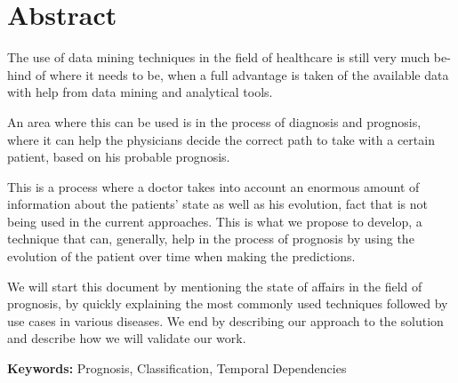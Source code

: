 
\section*{Abstract}


The use of data mining techniques in the field of healthcare is still very much be-hind of where it needs to be, when a full
advantage is taken of the available data with help from data mining and analytical tools.

An area where this can be used is in the process of diagnosis and prognosis, where it can help the physicians decide the
 correct path to take with a certain patient, based on his probable prognosis. 

This is a process where a doctor takes into account an enormous amount of information about the patients’ state as well
 as his evolution, fact that is not being used in the current approaches. This is what we propose to develop, a technique
 that can, generally, help in the process of prognosis by using the evolution of the patient over time when making the predictions.

We will start this document by mentioning the state of affairs in the field of prognosis, by quickly explaining the most
 commonly used techniques followed by use cases in various diseases. We end by describing our approach to the solution and 
 describe how we will validate our work. 


\vfill

\textbf{\Large Keywords:} Prognosis, Classification, Temporal Dependencies

\cleardoublepage

